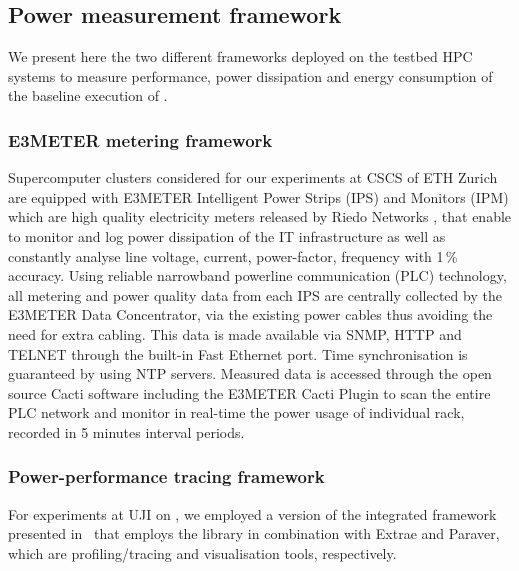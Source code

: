 \subsection{Power measurement framework}
\label{subsec:3.3}

We present here the two different  frameworks deployed on the testbed HPC systems to
measure  performance, power  dissipation and energy consumption of the baseline execution of \cosmoart.

\subsubsection{E3METER metering framework}

Supercomputer  clusters considered  for our  experiments at CSCS of ETH Zurich are equipped with
E3METER Intelligent  Power Strips (IPS)  and Monitors (IPM)  which are
high   quality   electricity  meters   released   by  Riedo   Networks
\citep{Riedonetworks},   that  enable   to  monitor   and   log  power
dissipation  of the IT  infrastructure as  well as  constantly analyse
line  voltage,  current, power-factor,  frequency  with 1\,\%  accuracy.
Using  reliable narrowband  powerline communication  (PLC) technology,
all  metering and  power  quality  data from  each  IPS are  centrally
collected  by the E3METER  Data Concentrator,  via the  existing power
cables thus  avoiding the need for  extra cabling.  This  data is made
available via  SNMP, HTTP and TELNET  through the built-in  Fast Ethernet
port.   Time  synchronisation  is  guaranteed by  using  NTP  servers.
Measured  data is  accessed  through the  open  source Cacti  software
including the E3METER Cacti Plugin  to scan the entire PLC network and
monitor in real-time the power usage of individual rack, recorded in 5
minutes interval periods.

\subsubsection{Power-performance tracing framework}

For experiments at UJI on \tinto, we employed a version
of the integrated framework presented in~\cite{energy13} that employs the \pmlib library in
combination with Extrae and Paraver, which  are profiling/tracing and
visualisation tools, respectively. 

